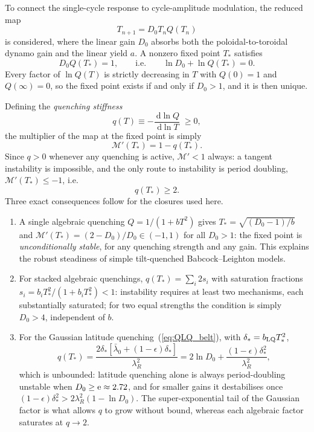 \documentclass[namedreferences,hyperref,optionalrh,solaromanenum]{spr-sola}
\newcommand{\rmd}{{\ \mathrm d}}
\begin{document}
To connect the single-cycle response to cycle-amplitude modulation, the
reduced map
%
\begin{equation}
T_{n+1}
=
D_0T_nQ(T_n)
\label{eq:cycle_map}
\end{equation}
%
is considered, where the linear gain $D_0$ absorbs both the
poloidal-to-toroidal dynamo gain and the linear yield $a$. A nonzero
fixed point $T_*$ satisfies
%
\begin{equation}
D_0Q(T_*)=1,
\qquad\text{i.e.}\qquad
\ln D_0+\ln Q(T_*)=0.
\label{eq:saturation_condition}
\end{equation}
%
Every factor of $\ln Q(T)$ is strictly decreasing in $T$ with $Q(0)=1$ and
$Q(\infty)=0$, so the fixed point exists if and only if $D_0>1$, and it is
then unique.

Defining the \emph{quenching stiffness}
%
\begin{equation}
q(T)
\equiv
-\frac{\rmd\ln Q}{\rmd\ln T}
\;\ge 0,
\label{eq:stiffness}
\end{equation}
%
the multiplier of the map at the fixed point is simply
%
\begin{equation}
\mathcal{M}'(T_*)
=
1-q(T_*).
\label{eq:Mprime}
\end{equation}
%
Since $q>0$ whenever any quenching is active, $\mathcal{M}'<1$ always: a
tangent instability is impossible, and the only route to instability is
period doubling, $\mathcal{M}'(T_*)\le-1$, i.e.
%
\begin{equation}
q(T_*)\ge2.
\label{eq:period_doubling}
\end{equation}
%
Three exact consequences follow for the closures used here.
\begin{enumerate}
\item
A single algebraic quenching $Q=1/(1+bT^2)$ gives
$T_*=\sqrt{(D_0-1)/b}$ and
$\mathcal{M}'(T_*)=(2-D_0)/D_0\in(-1,1)$ for all $D_0>1$: the fixed point
is \emph{unconditionally stable}, for any quenching strength and any gain.
This explains the robust steadiness of simple tilt-quenched
Babcock--Leighton models.
\item
For stacked algebraic quenchings, $q(T_*)=\sum_i2s_i$ with saturation
fractions $s_i=b_iT_*^2/(1+b_iT_*^2)<1$: instability requires at least two
mechanisms, each substantially saturated; for two equal strengths the
condition is simply $D_0>4$, independent of $b$.
\item
For the Gaussian latitude quenching~(\ref{eq:QLQ_belt}), with
$\delta_*=b_{\rm LQ}T_*^2$,
%
\begin{equation}
q(T_*)
=
\frac{2\delta_*\left[\bar{\lambda}_0+(1-\epsilon)\delta_*\right]}
{\lambda_R^2}
=
2\ln D_0+\frac{(1-\epsilon)\delta_*^2}{\lambda_R^2},
\label{eq:lq_stiffness}
\end{equation}
%
which is unbounded: latitude quenching alone is always period-doubling
unstable when $D_0\ge{\rm e}\approx2.72$, and for smaller gains it
destabilises once $(1-\epsilon)\delta_*^2>2\lambda_R^2(1-\ln D_0)$. The
super-exponential tail of the Gaussian factor is what allows $q$ to grow
without bound, whereas each algebraic factor saturates at $q\to2$.
\end{enumerate}
\end{document}
